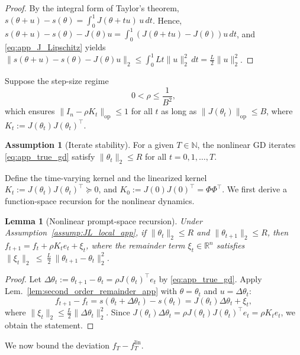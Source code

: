 \documentclass{article}
\theoremstyle{plain}
\newtheorem{lemma}[theorem]{Lemma}
\theoremstyle{definition}
\newtheorem{assumption}[theorem]{Assumption}
\theoremstyle{remark}
\begin{document}
\begin{proof}
By the integral form of Taylor's theorem, $s(\theta+u)-s(\theta)=\int_0^1 J(\theta+t u)\,u\,dt$. Hence, $s(\theta+u)-s(\theta)-J(\theta)u
=\int_0^1 (J(\theta+t u)-J(\theta))u\,dt$, and \eqref{eq:app_J_Lipschitz} yields
$\|s(\theta+u)-s(\theta)-J(\theta)u\|_2\le \int_0^1 Lt\|u\|_2^2\,dt=\frac{L}{2}\|u\|_2^2$.
\end{proof}

Suppose the step-size regime
\begin{equation}
    0<\rho\le \frac{1}{B^2},
\label{eq:app_rho_small}
\end{equation}
which ensures $\|I_n-\rho K_t\|_{\mathrm{op}}\le 1$ for all $t$ as long as $\|J(\theta_t)\|_{\mathrm{op}}\le B$, where $K_t:=J(\theta_t)J(\theta_t)^\top$.


\begin{assumption}[Iterate stability]
\label{assump:iterate_stability_app}
For a given $T\in\mathbb{N}$, the nonlinear GD iterates \eqref{eq:app_true_gd} satisfy
$\|\theta_t\|_2\le R$ for all $t=0,1,\dots,T$.
\end{assumption}

Define the time-varying kernel and the linearized kernel $K_t:=J(\theta_t)J(\theta_t)^\top\succeq 0$, and $K_0:=J(0)J(0)^\top=\Phi\Phi^\top$. We first derive a function-space recursion for the nonlinear dynamics.

\begin{lemma}[Nonlinear prompt-space recursion]
\label{lem:nonlinear_prompt_recursion_app}
Under Assumption~\ref{assump:JL_local_app}, if $\|\theta_t\|_2\le R$ and $\|\theta_{t+1}\|_2\le R$, then $f_{t+1}=f_t+\rho K_t e_t + \xi_t$, where the remainder term $\xi_t\in\mathbb{R}^n$ satisfies $\|\xi_t\|_2 \ \le\ \frac{L}{2}\,\|\theta_{t+1}-\theta_t\|_2^2$.
\end{lemma}

\begin{proof}
Let $\Delta\theta_t:=\theta_{t+1}-\theta_t=\rho J(\theta_t)^\top e_t$ by \eqref{eq:app_true_gd}. Apply Lem.~\ref{lem:second_order_remainder_app} with $\theta=\theta_t$ and $u=\Delta\theta_t$:
\[
    f_{t+1}-f_t=s(\theta_t+\Delta\theta_t)-s(\theta_t)=J(\theta_t)\Delta\theta_t+\xi_t,
\]
where $\|\xi_t\|_2\le \frac{L}{2}\|\Delta\theta_t\|_2^2.$ Since $J(\theta_t)\Delta\theta_t=\rho J(\theta_t)J(\theta_t)^\top e_t=\rho K_t e_t$, we obtain the statement.
\end{proof}

We now bound the deviation $f_T-f_T^{\mathrm{lin}}$.
\end{document}
